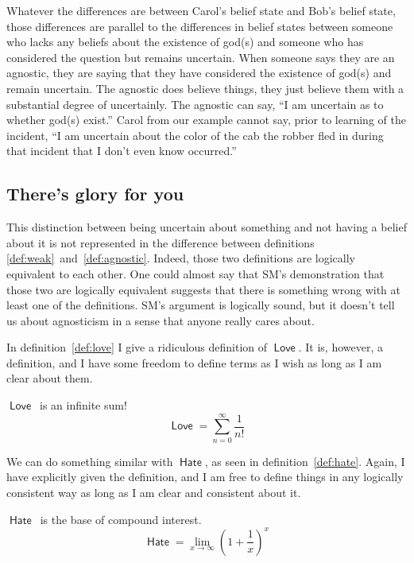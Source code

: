 \documentclass[12pt]{article}
\newcommand{\rel}[1]{\ensuremath{\mathop{\mathsf{#1}}}}
\newcommand{\rllove}{\rel{Love}}
\newcommand{\rlhate}{\rel{Hate}}
\begin{document}
Whatever the differences are between Carol's belief state and Bob's belief state, those differences are parallel to the differences in belief states between someone who lacks any beliefs about the existence of god(s) and someone who has considered the question but remains uncertain.
When someone says they are an agnostic, they are saying that they have considered the existence of god(s) and remain uncertain.
The agnostic does believe things, they just believe them with a substantial degree of uncertainly. The agnostic can say, “I am uncertain as to whether god(s) exist.”
Carol from our example cannot say, prior to learning of the incident, “I am uncertain about the color of the cab the robber fled in during that incident that I don't even know occurred.”

\subsection{There's glory for you}

This distinction between being uncertain about something and not having a belief about it
is not represented in the difference between definitions \ref{def:weak}~and~\ref{def:agnostic}.
Indeed, those two definitions are logically equivalent to each other.
One could almost say that SM's demonstration that those two are logically equivalent suggests that there is something wrong with at least one of the definitions.
SM's argument is logically sound, but it doesn't tell us about agnosticism in a sense that anyone really cares about.

In definition~\ref{def:love} I give a ridiculous definition of \rllove.
It is, however, a definition, and I have some freedom to define terms as I wish as long as I am clear about them.

\begin{definition}\label{def:love}
    \rllove\ is an infinite sum!
    \[
     \rllove = \sum_{n=0}^\infty \frac{1}{n!}   
    \]   
\end{definition}

We can do something similar with \rlhate, as seen in definition~\ref{def:hate}.
Again, I have explicitly given the definition, and I am free to define things in any logically consistent way as long as I am clear and consistent about it.

\begin{definition}\label{def:hate}
    \rlhate\ is the base of compound interest.
    \[
     \rlhate =  \lim_{x \to \infty}\left( 1 + \frac{1}{x}\right)^x 
    \]   
\end{definition}
\end{document}
